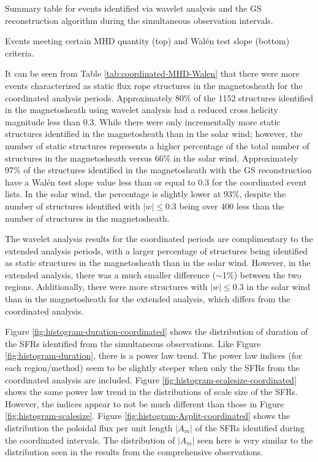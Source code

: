 \begin{table}
    \centering
    \caption{Summary table for events identified via wavelet analysis and the GS reconstruction algorithm during the simultaneous observation intervals.}
    
    \label{tab:coordinated-summary}
\end{table}

\begin{table}
    \centering
    \caption{Events meeting certain MHD quantity (top) and Wal\'en test slope (bottom) criteria.}
    
    \label{tab:coordinated-MHD-Walen}
\end{table}

It can be seen from Table \ref{tab:coordinated-MHD-Walen} that there were more events characterized as static flux rope structures in the magnetosheath for the coordinated analysis periods. Approximately 80\% of the 1152 structures identified in the magnetosheath using wavelet analysis had a reduced cross helicity magnitude less than 0.3. While there were only incrementally more static structures identified in the magnetosheath than in the solar wind; however, the number of static structures represents a higher percentage of the total number of structures in the magnetosheath versus 66\% in the solar wind. Approximately 97\% of the structures identified in the magnetosheath with the GS reconstruction have a Wal\'en test slope value less than or equal to 0.3 for the coordinated event lists. In the solar wind, the percentage is slightly lower at 93\%, despite the number of structures identified with $|w|\leq 0.3$ being over 400 less than the number of structures in the magnetosheath.

The wavelet analysis results for the coordinated periods are complimentary to the extended analysis periods, with a larger percentage of structures being identified as static structures in the magnetosheath than in the solar wind. However, in the extended analysis, there was a much smaller difference ($\sim$1\%) between the two regions. Additionally, there were more structures with $|w|\leq 0.3$ in the solar wind than in the magnetosheath for the extended analysis, which differs from the coordinated analysis. 

Figure \ref{fig:histogram-duration-coordinated} shows the distribution of duration of the SFRs identified from the simultaneous observations. Like Figure \ref{fig:histogram-duration}, there is a power law trend. The power law indices (for each region/method) seem to be slightly steeper when only the SFRs from the coordinated analysis are included. Figure \ref{fig:histogram-scalesize-coordinated} shows the same power law trend in the distributions of scale size of the SFRs. However, the indices appear to not be much different than those in Figure \ref{fig:histogram-scalesize}. Figure \ref{fig:histogram-Asplit-coordinated} shows the distribution the poloidal flux per unit length $|A_m|$ of the SFRs identified during the coordinated intervals. The distribution of $|A_m|$ seen here is very similar to the distribution seen in the results from the comprehensive observations.

